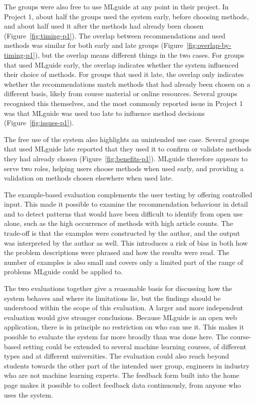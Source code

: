 The groups were also free to use MLguide at any point in 
their project. In Project 1, about half the groups used the 
system early, before choosing methods, and about half used 
it after the methods had already been chosen 
(Figure~\ref{fig:timing-p1}). The overlap between 
recommendations and used methods was similar for both early and late groups 
(Figure~\ref{fig:overlap-by-timing-p1}), but the overlap 
means different things in the two cases. For groups that 
used MLguide early, the overlap indicates whether the system 
influenced their choice of methods. For groups that used it 
late, the overlap only indicates whether the recommendations 
match methods that had already been chosen on a different 
basis, likely from course material or online resources. 
Several groups recognised this themselves, and the most 
commonly reported issue in Project 1 was that MLguide was 
used too late to influence method decisions 
(Figure~\ref{fig:issues-p1}).

The free use of the system also highlights an unintended 
use case. Several groups that used MLguide late reported 
that they used it to confirm or validate methods they had 
already chosen (Figure~\ref{fig:benefits-p1}). MLguide 
therefore appears to serve two roles, helping users choose 
methods when used early, and providing a validation on methods 
chosen elsewhere when used late.

The example-based evaluation complements the user testing by 
offering controlled input. This made it possible to examine 
the recommendation behaviour in detail and to detect 
patterns that would have been difficult to identify from open use 
alone, such as the high occurrence of methods with high article counts.
The trade-off is that the examples were constructed 
by the author, and the output was interpreted by the author 
as well. This introduces a risk of bias in both how the 
problem descriptions were phrased and how the results were 
read. The number of examples is also small and covers only a 
limited part of the range of problems MLguide could be 
applied to.

The two evaluations together give a reasonable basis for discussing how the 
system behaves and where its limitations lie, but the findings should be 
understood within the scope of this evaluation. A larger and more independent 
evaluation would give stronger conclusions. Because MLguide is an open web 
application, there is in principle no restriction on who can use it. This makes 
it possible to evaluate the system far more broadly than was done here. The 
course-based setting could be extended to several machine learning courses, of 
different types and at different universities. The evaluation could also reach 
beyond students towards the other part of the intended user group, engineers in 
industry who are not machine learning experts. The feedback form built into the 
home page makes it possible to collect feedback data continuously, from anyone who 
uses the system.

